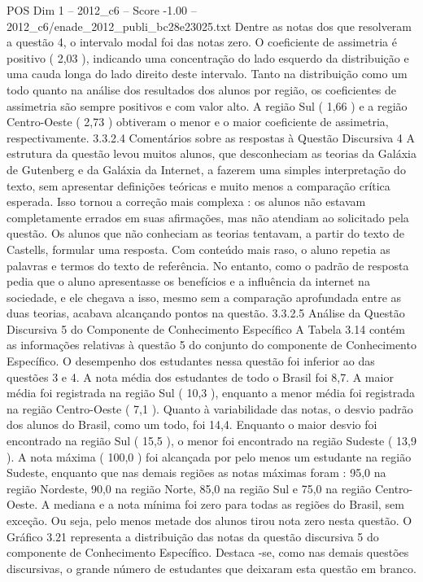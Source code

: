 \begin{textsample}{POS Dim 1 – 2012\_c6 – Score -1.00 – 2012\_c6/enade\_2012\_publi\_bc28e23025.txt}
Dentre as notas dos que resolveram a questão 4, o intervalo modal foi das notas zero.
O coeficiente de assimetria é positivo ( 2,03 ), indicando uma concentração do lado esquerdo da distribuição e uma cauda longa do lado direito deste intervalo.
Tanto na distribuição como um todo quanto na análise dos resultados dos alunos por região, os coeficientes de assimetria são sempre positivos e com valor alto.
A região Sul ( 1,66 ) e a região Centro-Oeste ( 2,73 ) obtiveram o menor e o maior coeficiente de assimetria, respectivamente. 3.3.2.4 Comentários sobre as respostas à Questão Discursiva 4 A estrutura da questão levou muitos alunos, que desconheciam as teorias da Galáxia de Gutenberg e da Galáxia da Internet, a fazerem uma simples interpretação do texto, sem apresentar definições teóricas e muito menos a comparação crítica esperada.
Isso tornou a correção mais complexa : os alunos não estavam completamente errados em suas afirmações, mas não atendiam ao solicitado pela questão.
Os alunos que não conheciam as teorias tentavam, a partir do texto de Castells, formular uma resposta.
Com conteúdo mais raso, o aluno repetia as palavras e termos do texto de referência.
No entanto, como o padrão de resposta pedia que o aluno apresentasse os benefícios e a influência da internet na sociedade, e ele chegava a isso, mesmo sem a comparação aprofundada entre as duas teorias, acabava alcançando pontos na questão. 3.3.2.5 Análise da Questão Discursiva 5 do Componente de Conhecimento Específico A Tabela 3.14 contém as informações relativas à questão 5 do conjunto do componente de Conhecimento Específico.
O desempenho dos estudantes nessa questão foi inferior ao das questões 3 e 4.
A nota média dos estudantes de todo o Brasil foi 8,7.
A maior média foi registrada na região Sul ( 10,3 ), enquanto a menor média foi registrada na região Centro-Oeste ( 7,1 ).
Quanto à variabilidade das notas, o desvio padrão dos alunos do Brasil, como um todo, foi 14,4.
Enquanto o maior desvio foi encontrado na região Sul ( 15,5 ), o menor foi encontrado na região Sudeste ( 13,9 ).
A nota máxima ( 100,0 ) foi alcançada por pelo menos um estudante na região Sudeste, enquanto que nas demais regiões as notas máximas foram : 95,0 na região Nordeste, 90,0 na região Norte, 85,0 na região Sul e 75,0 na região Centro-Oeste.
A mediana e a nota mínima foi zero para todas as regiões do Brasil, sem exceção.
Ou seja, pelo menos metade dos alunos tirou nota zero nesta questão.
O Gráfico 3.21 representa a distribuição das notas da questão discursiva 5 do componente de Conhecimento Específico.
Destaca -se, como nas demais questões discursivas, o grande número de estudantes que deixaram esta questão em branco.

\end{textsample}
